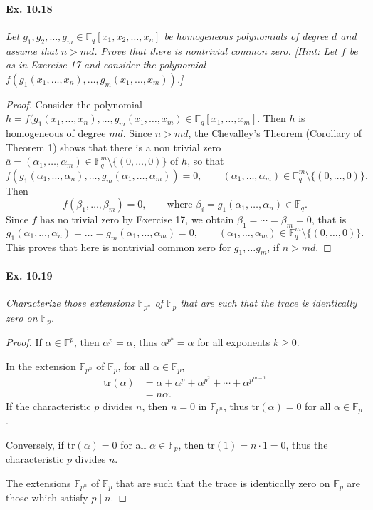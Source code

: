 \documentclass[11pt,a4paper]{article}
\newcommand{\F}{\mathbb{F}}
\begin{document}
\paragraph{Ex. 10.18} {\it Let $g_1,g_2,\ldots,g_m\in \F_q[x_1,x_2,\ldots,x_n]$ be homogeneous polynomials of degree $d$ and assume that $n>md$. Prove that there is nontrivial common zero. [Hint: Let $f$ be as in Exercise 17 and consider the polynomial $f(g_1(x_1,\ldots,x_n),\ldots,g_m(x_1,\ldots,x_m))$.]
}
\begin{proof}
Consider the polynomial $h = f(g_1(x_1,\ldots,x_n),\ldots,g_m(x_1,\ldots,x_m) \in \F_q[x_1,\ldots,x_m]$. Then $h$ is homogeneous of degree $md$. Since $n > md$, the Chevalley's Theorem (Corollary of Theorem 1) shows that there is a non trivial zero $\overline{a} = (\alpha_1,\ldots,\alpha_m) \in \F_q^m\setminus\{(0,\ldots,0)\}$ of $h$, so that
$$f(g_1(\alpha_1,\ldots,\alpha_n),\ldots,g_m(\alpha_1,\ldots,\alpha_m)) = 0,\qquad (\alpha_1,\ldots,\alpha_m) \in \F_q^m \setminus\{(0,\ldots,0)\}.$$
Then
$$f(\beta_1,\ldots,\beta_m) = 0,\qquad \text{where } \beta_i = g_1(\alpha_1,\ldots,\alpha_n) \in \F_q.$$
Since $f$ has no trivial zero by Exercise 17, we obtain $\beta_1 =\cdots = \beta_m = 0$, that is
$$g_1(\alpha_1,\ldots,\alpha_n)=\ldots =g_m(\alpha_1,\ldots,\alpha_m)=0,\qquad (\alpha_1,\ldots,\alpha_m) \in \F_q^m\setminus\{(0,\ldots,0)\}.$$
This proves that here is nontrivial common zero for $g_1, \ldots g_m$, if $n>md$.
\end{proof}

\paragraph{Ex. 10.19} {\it Characterize those extensions $\F_{p^n}$ of $\F_p$ that are such that the trace is identically zero on $\F_p$.
}
\begin{proof}
If $\alpha \in \F^p$, then $\alpha^p = \alpha$, thus $\alpha^{p^k} = \alpha$ for all exponents $k\geq 0$.

In the extension $\F_{p^n}$ of $\F_p$, for all $\alpha \in \F_p$,
\begin{align*}
\mathrm{tr}(\alpha) &= \alpha + \alpha^p + \alpha^{p^2}+ \cdots + \alpha^{p^{m-1}}\\
&= n \alpha.
\end{align*}
If the characteristic $p$ divides $n$, then $n = 0$ in $\F_{p^n}$, thus $\mathrm{tr}(\alpha) = 0$ for all $\alpha \in \F_p$.

Conversely, if $\mathrm{tr}(\alpha) = 0$ for all $\alpha \in \F_p$, then $\mathrm{tr}(1) = n\cdot 1 = 0$, thus the characteristic $p$ divides $n$.

The extensions $\F_{p^n}$ of $\F_p$ that are such that the trace is identically zero on $\F_p$ are those which satisfy $p \mid n$.


\end{proof}
\end{document}
